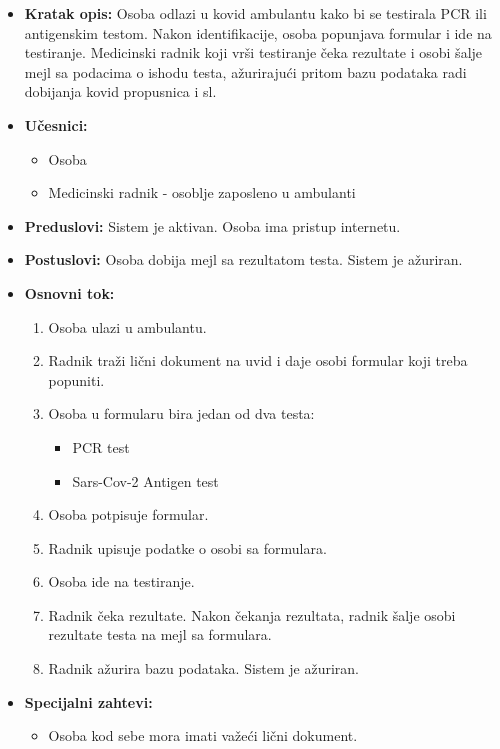 \documentclass[titlepage]{article}
\begin{document}
\begin{itemize}
    \item \textbf{Kratak opis:} Osoba odlazi u kovid ambulantu kako bi se testirala PCR ili antigenskim testom. Nakon identifikacije, osoba popunjava formular i ide na testiranje. Medicinski radnik koji vrši testiranje čeka rezultate i osobi šalje mejl sa podacima o ishodu testa, ažurirajući pritom bazu podataka radi dobijanja kovid propusnica i sl.
    \item \textbf{Učesnici:}
        \begin{itemize}
            \item Osoba
            \item Medicinski radnik - osoblje zaposleno u ambulanti
        \end{itemize}
    \item \textbf{Preduslovi:} Sistem je aktivan. Osoba ima pristup internetu.
    \item \textbf{Postuslovi:} Osoba dobija mejl sa rezultatom testa. Sistem je ažuriran.
    \item \textbf{Osnovni tok:}
        \begin{enumerate}
           \item Osoba ulazi u ambulantu.
           \item Radnik traži lični dokument na uvid i daje osobi formular koji treba popuniti. \item Osoba u formularu bira jedan od dva testa:
           \begin{itemize}
               \item PCR test
               \item Sars-Cov-2 Antigen test
           \end{itemize}
           \item Osoba potpisuje formular.
           \item Radnik upisuje podatke o osobi sa formulara.
           \item Osoba ide na testiranje.
           \item Radnik čeka rezultate. Nakon čekanja rezultata, radnik šalje osobi rezultate testa na mejl sa formulara.
           \item Radnik ažurira bazu podataka. Sistem je ažuriran.
        \end{enumerate}
    \item \textbf{Specijalni zahtevi:}
        \begin{itemize}
            \item Osoba kod sebe mora imati važeći lični dokument.

\end{itemize}
\end{itemize}
\end{document}
